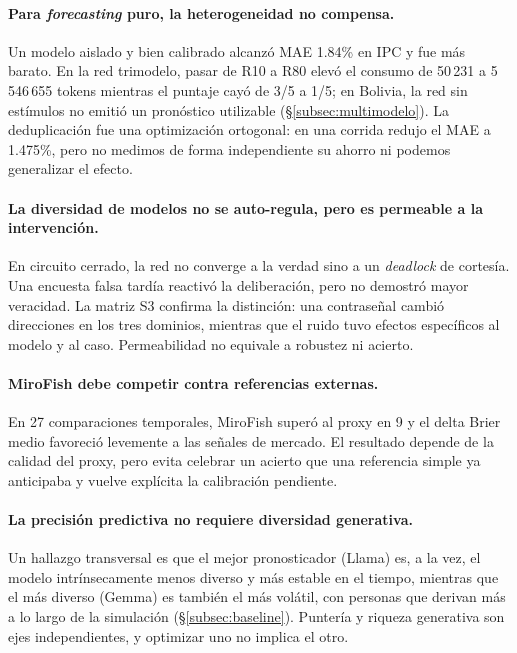 \documentclass[11pt]{article}
\begin{document}
\paragraph{Para \textit{forecasting} puro, la heterogeneidad no compensa.} Un modelo aislado y bien calibrado alcanzó MAE 1.84\% en IPC y fue más barato. En la red trimodelo, pasar de R10 a R80 elevó el consumo de 50\,231 a 5\,546\,655 tokens mientras el puntaje cayó de 3/5 a 1/5; en Bolivia, la red sin estímulos no emitió un pronóstico utilizable (§\ref{subsec:multimodelo}). La deduplicación fue una optimización ortogonal: en una corrida redujo el MAE a 1.475\%, pero no medimos de forma independiente su ahorro ni podemos generalizar el efecto.

\paragraph{La diversidad de modelos no se auto-regula, pero es permeable a la intervención.} En circuito cerrado, la red no converge a la verdad sino a un \textit{deadlock} de cortesía. Una encuesta falsa tardía reactivó la deliberación, pero no demostró mayor veracidad. La matriz S3 confirma la distinción: una contraseñal cambió direcciones en los tres dominios, mientras que el ruido tuvo efectos específicos al modelo y al caso. Permeabilidad no equivale a robustez ni acierto.

\paragraph{MiroFish debe competir contra referencias externas.} En 27 comparaciones temporales, MiroFish superó al proxy en 9 y el delta Brier medio favoreció levemente a las señales de mercado. El resultado depende de la calidad del proxy, pero evita celebrar un acierto que una referencia simple ya anticipaba y vuelve explícita la calibración pendiente.

\paragraph{La precisión predictiva no requiere diversidad generativa.} Un hallazgo transversal es que el mejor pronosticador (Llama) es, a la vez, el modelo intrínsecamente menos diverso y más estable en el tiempo, mientras que el más diverso (Gemma) es también el más volátil, con personas que derivan más a lo largo de la simulación (§\ref{subsec:baseline}). Puntería y riqueza generativa son ejes independientes, y optimizar uno no implica el otro.
\end{document}
